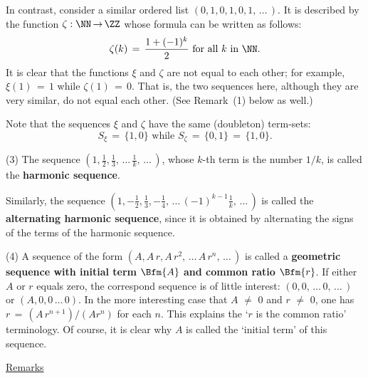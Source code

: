         In contrast, consider a similar ordered list $(0,1,0,1,0,1,\,{\ldots}\,)$.
    It is described by the function ${\zeta}:{\NN} \,{\rightarrow}\, {\ZZ}$
    whose formula can be written as follows:
        \begin{displaymath}
        {\zeta}(k) \,=\, \frac{1 + (-1)^{k}}{2} \mbox{ for all $k$ in ${\NN}$}.
        \end{displaymath}
    It is clear that the functions ${\xi}$ and ${\zeta}$ are not equal to each other; for example, ${\xi}(1) \,=\, 1$ while ${\zeta}(1) \,=\, 0$.
    That is, the two sequences here, although they are very similar, do not equal each other. (See Remark~(1) below as well.)

        Note that the sequences ${\xi}$ and ${\zeta}$ have the same (doubleton) term-sets:
        \begin{displaymath}
        S_{{\xi}} \,=\, \{1,0\} \mbox{ while } S_{{\zeta}} \,=\, \{0,1\} \,=\, \{1,0\}.
        \end{displaymath}

\V

        (3) The sequence $\left({\displaystyle 1, \frac{1}{2}, \frac{1}{3},\,{\ldots}\,\frac{1}{k},\,{\ldots}\,}\right)$,
    whose $k$-th term is the number $1/k$, is called the {\bf harmonic sequence}.

        Similarly, the sequence ${\displaystyle \left(1, -\frac{1}{2}, \frac{1}{3}, -\frac{1}{4},\,{\ldots}\,(-1)^{k-1}\frac{1}{k},\,{\ldots}\,\right)}$ is called the {\bf alternating harmonic sequence},
    since it is obtained by alternating the signs of the terms of the harmonic sequence.

\V

        (4) A sequence of the form $(A, A\,r, A\,r^{2},\,{\ldots}\,A\,r^{n},\,{\ldots}\,)$ is called a {\bf geometric sequence with initial term $\Bfm{A}$ and common ratio $\Bfm{r}$}.
    If either $A$ or $r$ equals zero, the correspond sequence is of little interest: $(0,0,\,{\ldots}\,0,\,{\ldots}\,)$ or $(A,0,0\,{\ldots}\,0)$.
    In the more interesting case that $A \,\,{\neq}\,\, 0$ and $r \,\,{\neq}\,\, 0$, one has $r \,=\, (A\,r^{n+1})/(Ar^{n})$ for each $n$.
    This explains the `$r$ is the common ratio' terminology. Of course, it is clear why $A$ is called the `initial term' of this sequence.

\VV

        \underline{Remarks}

